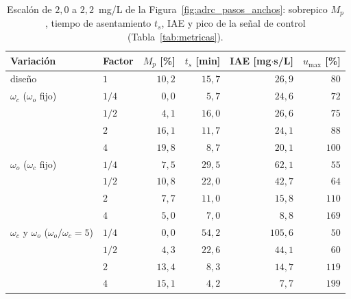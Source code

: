 \begin{table}[tbp]
\centering
\caption[Desempeño del escalón al variar los anchos de banda]{Escalón de
  $2{,}0$ a $2{,}2$~mg/L de la Figura~\ref{fig:adrc_pasos_anchos}: sobrepico $M_p$, tiempo de
  asentamiento $t_s$, IAE y pico de la señal de control (Tabla~\ref{tab:metricas}).}
\label{tab:adrc_iae_anchos}
\small
\begin{tabular}{llrrrr}
\toprule
\textbf{Variación} & \textbf{Factor} & $M_p$ [\%] & $t_s$ [min] & IAE [mg$\cdot$s/L] & $u_{\max}$ [\%] \\
\midrule
diseño & $1$ & $10{,}2$ & $15{,}7$ & $26{,}9$ & $80$ \\
\midrule
$\omega_c$ ($\omega_o$ fijo) & $1/4$ & $0{,}0$ & $5{,}7$ & $24{,}6$ & $72$ \\
 & $1/2$ & $4{,}1$ & $16{,}0$ & $26{,}6$ & $75$ \\
 & $2$ & $16{,}1$ & $11{,}7$ & $24{,}1$ & $88$ \\
 & $4$ & $19{,}8$ & $8{,}7$ & $20{,}1$ & $100$ \\
\midrule
$\omega_o$ ($\omega_c$ fijo) & $1/4$ & $7{,}5$ & $29{,}5$ & $62{,}1$ & $55$ \\
 & $1/2$ & $10{,}8$ & $22{,}0$ & $42{,}7$ & $64$ \\
 & $2$ & $7{,}7$ & $11{,}0$ & $15{,}8$ & $110$ \\
 & $4$ & $5{,}0$ & $7{,}0$ & $8{,}8$ & $169$ \\
\midrule
$\omega_c$ y $\omega_o$ ($\omega_o/\omega_c = 5$) & $1/4$ & $0{,}0$ & $54{,}2$ & $105{,}6$ & $50$ \\
 & $1/2$ & $4{,}3$ & $22{,}6$ & $44{,}1$ & $60$ \\
 & $2$ & $13{,}4$ & $8{,}3$ & $14{,}7$ & $119$ \\
 & $4$ & $15{,}1$ & $4{,}2$ & $7{,}7$ & $199$ \\
\bottomrule
\end{tabular}
\end{table}

